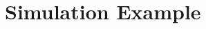 \documentclass[journal,onecolumn]{IEEEtran}
\begin{document}





\section{Simulation Example}
\end{document}
